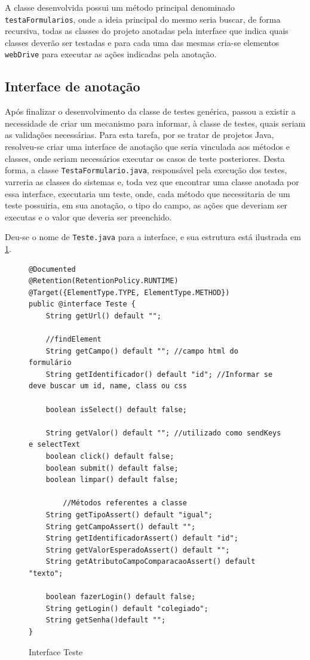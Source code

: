 \documentclass[tg]{mdtufsm}
\begin{document}
A classe desenvolvida possui um método principal denominado \texttt{testaFormularios}, onde a ideia principal do mesmo seria buscar,
de forma recursiva, todas as classes do projeto anotadas pela interface que indica quais classes deverão ser testadas e para cada uma das mesmas cria-se elementos \texttt{webDrive} para executar as ações indicadas pela anotação.

\subsection{Interface de anotação}

Após finalizar o desenvolvimento da classe de testes genérica, passou a existir a necessidade de criar um mecanismo para informar, à classe de testes, quais seriam as validações necessárias. Para esta tarefa, por se tratar de projetos Java, resolveu-se criar uma interface de anotação que seria vinculada aos métodos e classes, onde seriam necessários executar os casos de teste posteriores. Desta forma, a classe \texttt{TestaFormulario.java},
responsável pela execução dos testes, varreria as classes do sistemas e, toda vez que encontrar uma classe anotada por essa interface, executaria um teste, onde, cada método que necessitaria de um teste possuiria, em sua anotação, o tipo do campo,
as ações que deveriam ser executas e o valor que deveria ser preenchido.

Deu-se o nome de \texttt{Teste.java} para a interface, e sua estrutura está ilustrada em \ref{code:Teste.java}.

\begin{figure}[!htt]
\begin{lstlisting}
@Documented
@Retention(RetentionPolicy.RUNTIME)
@Target({ElementType.TYPE, ElementType.METHOD})
public @interface Teste {
    String getUrl() default "";

    //findElement
    String getCampo() default ""; //campo html do formulário
    String getIdentificador() default "id"; //Informar se deve buscar um id, name, class ou css

    boolean isSelect() default false;

    String getValor() default ""; //utilizado como sendKeys e selectText
    boolean click() default false;
    boolean submit() default false;
    boolean limpar() default false;
	
		//Métodos referentes a classe
    String getTipoAssert() default "igual";
    String getCampoAssert() default "";
    String getIdentificadorAssert() default "id";
    String getValorEsperadoAssert() default "";
    String getAtributoCampoComparacaoAssert() default "texto";

    boolean fazerLogin() default false;
    String getLogin() default "colegiado";
    String getSenha()default "";
}
\end{lstlisting}
	\caption{Interface Teste}
	\label{code:Teste.java}
\end{figure}
\end{document}

